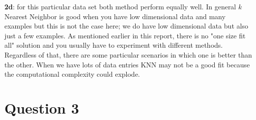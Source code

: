 \documentclass[11pt]{article}
\begin{document}
\textbf{2d}: for this particular data set both method perform equally well. In general $k$ Nearest Neighbor is good when you have low dimensional data and many examples but this is not the case here; we do have low dimensional data but also just a few examples. As mentioned earlier in this report, there is no "one size fit all" solution and you usually have to experiment with different methods. Regardless of that, there are some particular scenarios in which one is better than the other. When we have lots of data entries KNN may not be a good fit because the computational complexity could explode. 

\section*{Question 3}
\end{document}
